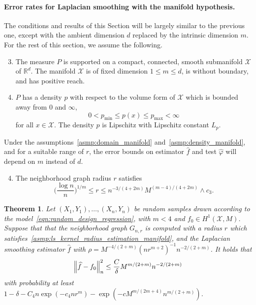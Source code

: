 \documentclass[twoside]{article}
\newcommand{\Reals}{\mathbb{R}}
\newcommand{\1}{\mathbf{1}}
\newcommand{\Xset}{\mathcal{X}}
\newcommand{\wh}[1]{\widehat{#1}}
\newtheorem{theorem}{Theorem}
\theoremstyle{definition}
\theoremstyle{remark}
\begin{document}
\paragraph{Error rates for Laplacian smoothing with the manifold hypothesis.}
The conditions and results of this Section will be largely similar to the previous one, except with the ambient dimension $d$ replaced by the intrinsic dimension $m$. For the rest of this section, we assume the following.
\begin{enumerate}[label=(P\arabic*)]
	\setcounter{enumi}{2}
	\item 
	\label{asmp:domain_manifold}
	The measure $P$ is supported on a compact, connected, smooth submanifold $\Xset$ of $\Reals^d$. The manifold $\Xset$ is of fixed dimension $1 \leq m \leq d$, is without boundary, and has positive reach. 
	\item 
	\label{asmp:density_manifold} $P$ has a density $p$ with respect to the volume form of $\Xset$ which is bounded away from $0$ and $\infty$,
	\begin{equation*}
	0 < p_{\min} \leq p(x) \leq p_{\max} < \infty
	\end{equation*}
	for all $x \in \Xset$. The density $p$ is Lipschitz with Lipschitz constant $L_p$.
\end{enumerate}
Under the assumptions~\ref{asmp:domain_manifold} and~\ref{asmp:density_manifold}, and for a suitable range of $r$, the error bounds on estimator $\wh{f}$ and test $\wh{\varphi}$ will depend on $m$ instead of $d$. 

\begin{enumerate}[label=(R\arabic*)]
	\setcounter{enumi}{3}
	\item 
	\label{asmp:ls_kernel_radius_estimation_manifold}
	The neighborhood graph radius $r$ satisfies
	\begin{equation*}
	\biggl(\frac{\log n}{n}\biggr)^{1/m} \leq r \leq n^{-3/(4 + 2m)} M^{(m - 4)/(4 + 2m)} \wedge c_3.
	\end{equation*}
\end{enumerate}
\begin{theorem}
	\label{thm:laplacian_smoothing_estimation_manifold}
	Let $(X_1,Y_1),\ldots,(X_n,Y_n)$ be random samples drawn according to the model~\eqref{eqn:random_design_regression}, with $m < 4$ and $f_0 \in H^1(\Xset,M)$. Suppose that that the neighborhood graph $G_{n,r}$ is computed with a radius $r$ which satisfies~\ref{asmp:ls_kernel_radius_estimation_manifold},  and the Laplacian smoothing estimator $\wh{f}$ with $\rho = M^{-4/(2 + m)} (nr^{m + 2})^{-1} n^{-2/(2 + m)}$. It holds that
	\begin{equation*}
	\Bigl\|\wh{f} - f_0\Bigr\|_n^2 \leq \frac{C}{\delta} M^{m/(2 + m)} n^{-2/(2 + m)}
	\end{equation*}
	with probability at least $1 - \delta -  C_4n\exp(-c_4nr^m) - \exp(-c M^{m/(2m + 4)} n^{m/(2+m)})$.
\end{theorem}
\end{document}
